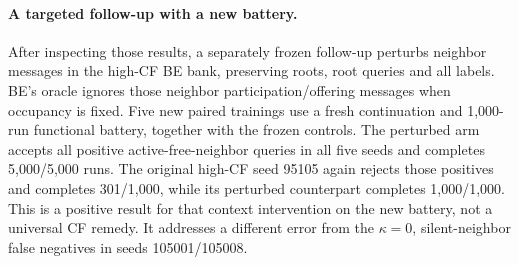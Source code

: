 \paragraph{A targeted follow-up with a new battery.}
After inspecting those results, a separately frozen follow-up perturbs
neighbor messages in the high-CF BE bank, preserving roots, root queries
and all labels. BE's oracle ignores those neighbor participation/offering
messages when occupancy is fixed. Five new paired trainings use a fresh
continuation and 1,000-run functional battery, together with the frozen
controls. The perturbed arm accepts all positive active-free-neighbor queries
in all five seeds and completes 5,000/5,000 runs. The original high-CF
seed 95105 again rejects those positives and completes 301/1,000, while its
perturbed counterpart completes 1,000/1,000. This is a positive result for
that context intervention on the new battery, not a universal CF remedy.
It addresses a different error from the $\kappa=0$, silent-neighbor
false negatives in seeds 105001/105008.
